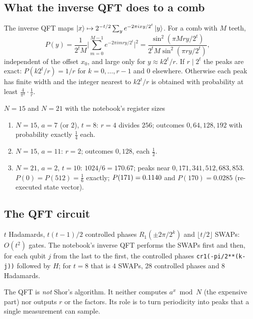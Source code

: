 \documentclass[11pt,a4paper,openany]{book}
\newcounter{wex}[chapter]
\newenvironment{steps}{\begin{enumerate}[label=\textbf{Step \arabic*.}, leftmargin=4.2em, itemsep=2pt]}{\end{enumerate}}
\begin{document}
\subsection{What the inverse QFT does to a comb}
The inverse QFT maps $\ket x \mapsto 2^{-t/2}\sum_ye^{-2\pi ixy/2^t}\ket y$. For a comb with $M$ teeth,
\[ P(y) = \frac{1}{2^tM}\Big|\sum_{m=0}^{M-1}e^{-2\pi imry/2^t}\Big|^2 = \frac{\sin^2(\pi Mry/2^t)}{2^tM\sin^2(\pi ry/2^t)}, \]
independent of the offset $x_0$, and large only for $y \approx k2^t/r$. If $r \mid 2^t$ the peaks are exact: $P(k2^t/r) = 1/r$ for $k = 0, \dots, r - 1$ and
$0$ elsewhere. Otherwise each peak has finite width and the integer nearest to $k2^t/r$ is obtained with probability at least $\frac{4}{\pi^2}\cdot\frac1r$.

\begin{wexample}{$N = 15$ and $N = 21$ with the notebook's register sizes}
\begin{steps}
\item $N = 15$, $a = 7$ (or $2$), $t = 8$: $r = 4$ divides $256$; outcomes $0, 64, 128, 192$ with probability exactly $\frac14$ each.
\item $N = 15$, $a = 11$: $r = 2$; outcomes $0, 128$, each $\frac12$.
\item $N = 21$, $a = 2$, $t = 10$: $1024/6 = 170.67$; peaks near $0, 171, 341, 512, 683, 853$. $P(0) = P(512) = \frac16$ exactly; $P(171) = 0.1140$ and
      $P(170) = 0.0285$ (re-executed state vector).
\end{steps}
\end{wexample}

\subsection{The QFT circuit}
$t$ Hadamards, $t(t - 1)/2$ controlled phases $R_1(\pm2\pi/2^k)$ and $\lfloor t/2\rfloor$ SWAPs: $O(t^2)$ gates. The notebook's inverse QFT performs the SWAPs
first and then, for each qubit $j$ from the last to the first, the controlled phases \texttt{cr1(-pi/2**(k-j))} followed by $H$; for $t = 8$ that is
$4$ SWAPs, $28$ controlled phases and $8$ Hadamards.
\begin{trap}
The QFT is \emph{not} Shor's algorithm. It neither computes $a^x \bmod N$ (the expensive part) nor outputs $r$ or the factors. Its role is to turn
periodicity into peaks that a single measurement can sample.
\end{trap}

\end{document}
